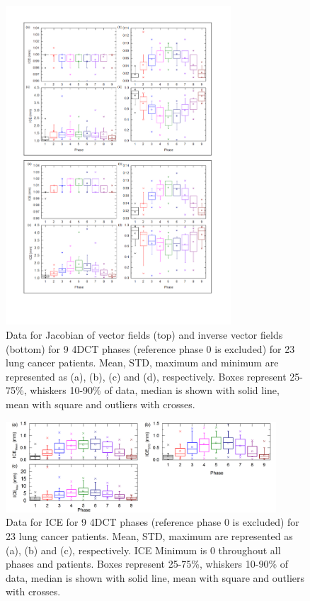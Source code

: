 \documentclass[type=dr, dr=rernat, accentcolor=tud7b,colorbacktitle, bigchapter, openright, twoside, 12pt ]{tudthesis}
\begin{document}
\newpage

\begin{figure}[H]
	\begin{center}		
		\includegraphics[width=0.75\textwidth]{./Images/Jacobian_data.png}
		\caption{Data for Jacobian of vector fields (top) and inverse vector fields (bottom) for 9 4DCT phases (reference phase 0 is excluded) for 23 lung cancer patients. Mean, STD, maximum and minimum are represented as (a), (b), (c) and (d), respectively.
		Boxes represent 25-75\%, whiskers 10-90\% of data, median is shown with solid line, mean with square and outliers with crosses.}
		\label{jacobian_data}
	\end{center}
\end{figure}

\newpage

\begin{figure}[H]
	\begin{center}		
		\includegraphics[width=0.9\textwidth]{./Images/ICE.png}
		\caption{Data for ICE for 9 4DCT phases (reference phase 0 is excluded) for 23 lung cancer patients. Mean, STD, maximum are represented as (a), (b) and (c), respectively. ICE Minimum is 0 throughout all phases and patients.
		Boxes represent 25-75\%, whiskers 10-90\% of data, median is shown with solid line, mean with square and outliers with crosses.}
		\label{ice}
	\end{center}
\end{figure}
\end{document}
